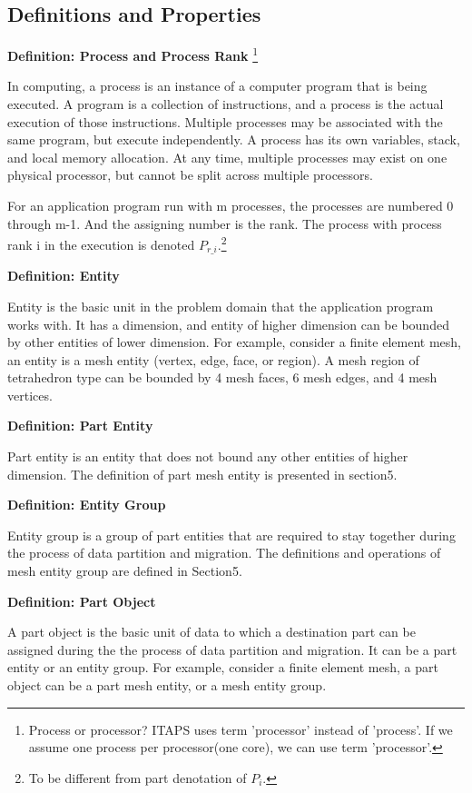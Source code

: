 \subsection{Definitions and Properties}   


\textbf{Definition: Process and Process Rank} \footnote{Process or
  processor? ITAPS\cite{ITAPS} uses term 'processor' instead of 'process'. If
  we assume one process per processor(one core), we can use term
  'processor'.} 

In computing, a process is an instance of a computer program that is
being executed. A program is a collection of instructions, and a
process is the actual execution of those instructions. Multiple
processes may be associated with the same program, but execute
independently. A process has its own variables, stack, and local
memory allocation. At any time, multiple processes may exist on one
physical processor, but cannot be split across multiple processors. 

For an application program run with m processes, the processes are
numbered 0 through m-1. And the assigning number is the rank. The
process with process rank i in the execution is denoted
$P_{r\_i}$.\footnote{To be different from part denotation of $P_i$.}   


\textbf{Definition: Entity}

Entity is the basic unit in the problem domain that the application
program works
with. It has a dimension, and entity of higher dimension can be
bounded by other entities of lower dimension.  
For example, consider a finite element
mesh, an entity is a mesh entity (vertex, edge, face,
or region). A mesh region of tetrahedron
type can be bounded by 4 mesh faces, 6 mesh edges, and 4 mesh
vertices. 

\textbf{Definition: Part Entity}

Part entity is an entity that does not bound any other entities of
higher dimension. The definition of part mesh entity is presented in
section5. 

\textbf{Definition: Entity Group}

Entity group is a group of part entities that are required to stay
together during the process of data partition and migration. The
definitions and operations of mesh entity group are defined in
Section5. 


\textbf{Definition: Part Object} 

A part object is the basic unit of data to which a destination part
can be assigned during the the process of data partition and
migration. It can be a part entity or an entity group. 
 For example, consider a finite element
 mesh, a part object can be a part mesh entity, or a mesh entity
 group. 


